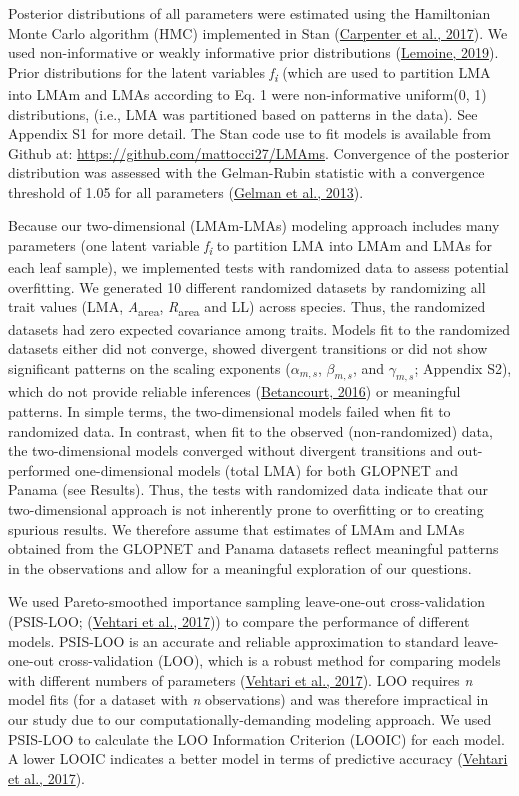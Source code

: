 \documentclass[
  12pt,
  letterpaper,
  DIV=11,
  numbers=noendperiod]{scrartcl}
\begin{document}
Posterior distributions of all parameters were estimated using the
Hamiltonian Monte Carlo algorithm (HMC) implemented in Stan
(\protect\hyperlink{ref-Carpenter2017}{Carpenter et al., 2017}). We used
non-informative or weakly informative prior distributions
(\protect\hyperlink{ref-Lemoine2019}{Lemoine, 2019}). Prior
distributions for the latent variables \emph{f\textsubscript{i}} (which
are used to partition LMA into LMAm and LMAs according to Eq. 1 were
non-informative uniform(0, 1) distributions, (i.e., LMA was partitioned
based on patterns in the data). See Appendix S1 for more detail. The
Stan code use to fit models is available from Github at:
\url{https://github.com/mattocci27/LMAms}. Convergence of the posterior
distribution was assessed with the Gelman-Rubin statistic with a
convergence threshold of 1.05 for all parameters
(\protect\hyperlink{ref-Gelman2013}{Gelman et al., 2013}).

Because our two-dimensional (LMAm-LMAs) modeling approach includes many
parameters (one latent variable \emph{f\textsubscript{i}} to partition
LMA into LMAm and LMAs for each leaf sample), we implemented tests with
randomized data to assess potential overfitting. We generated 10
different randomized datasets by randomizing all trait values (LMA,
\emph{A}\textsubscript{area}, \emph{R}\textsubscript{area} and LL)
across species. Thus, the randomized datasets had zero expected
covariance among traits. Models fit to the randomized datasets either
did not converge, showed divergent transitions or did not show
significant patterns on the scaling exponents (\(\alpha_{m,s}\),
\(\beta_{m,s}\), and \(\gamma_{m,s}\); Appendix S2), which do not
provide reliable inferences
(\protect\hyperlink{ref-Betancourt2016}{Betancourt, 2016}) or meaningful
patterns. In simple terms, the two-dimensional models failed when fit to
randomized data. In contrast, when fit to the observed (non-randomized)
data, the two-dimensional models converged without divergent transitions
and out-performed one-dimensional models (total LMA) for both GLOPNET
and Panama (see Results). Thus, the tests with randomized data indicate
that our two-dimensional approach is not inherently prone to overfitting
or to creating spurious results. We therefore assume that estimates of
LMAm and LMAs obtained from the GLOPNET and Panama datasets reflect
meaningful patterns in the observations and allow for a meaningful
exploration of our questions.

We used Pareto-smoothed importance sampling leave-one-out
cross-validation (PSIS-LOO; (\protect\hyperlink{ref-Vehtari2017}{Vehtari
et al., 2017})) to compare the performance of different models. PSIS-LOO
is an accurate and reliable approximation to standard leave-one-out
cross-validation (LOO), which is a robust method for comparing models
with different numbers of parameters
(\protect\hyperlink{ref-Vehtari2017}{Vehtari et al., 2017}). LOO
requires \emph{n} model fits (for a dataset with \emph{n} observations)
and was therefore impractical in our study due to our
computationally-demanding modeling approach. We used PSIS-LOO to
calculate the LOO Information Criterion (LOOIC) for each model. A lower
LOOIC indicates a better model in terms of predictive accuracy
(\protect\hyperlink{ref-Vehtari2017}{Vehtari et al., 2017}).
\end{document}
